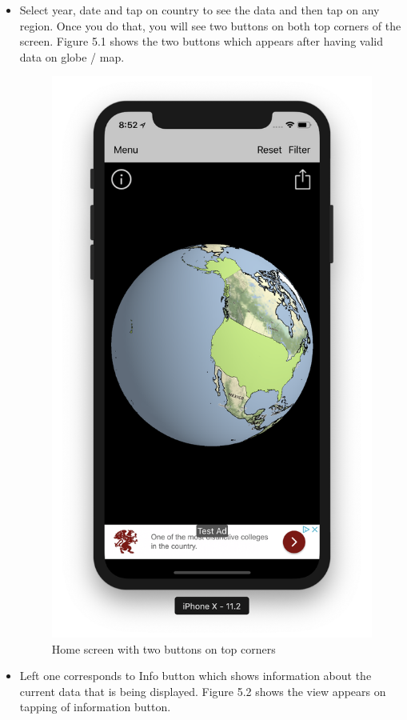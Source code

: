 \begin{itemize}
    \item Select year, date and tap on country to see the data and then tap on any region. Once you do that, you will see two buttons on both top corners of the screen. Figure 5.1 shows the two buttons which appears after having valid data on globe / map. \\
    
      \begin{figure}[H]
            \centering
            \includegraphics[width=0.5\linewidth]{figures/ch5/buttons.png}
            \caption{\label{fig:buttons} Home screen with two buttons on top corners}
        \end{figure}
        
        \newpage
    
    
    \item Left one corresponds to Info button which shows information about the current data that is being displayed. Figure 5.2 shows the view appears on tapping of information button. \\
    

\end{itemize}
